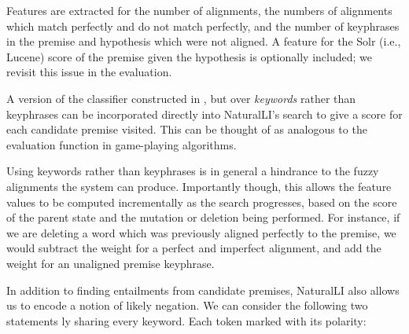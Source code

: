 Features are extracted for the number of alignments, the numbers of alignments
  which match perfectly and do not match perfectly, 
  and the number of keyphrases in the premise and hypothesis
  which were not aligned.
A feature for the Solr (i.e., Lucene) score of the premise given the hypothesis is optionally
  included; we revisit this issue in the evaluation.

%
%
A version of the classifier constructed in 
  , but over \textit{keywords} rather
  than keyphrases can be incorporated directly into
  NaturalLI's search to give a score for each candidate premise visited.
This can be thought of as analogous to the evaluation function in game-playing
  algorithms.


Using keywords rather than keyphrases is in general a hindrance to the
  fuzzy alignments the system can produce.
Importantly though, this allows the feature values to be computed 
  incrementally as the search
  progresses, based on the score of the parent state and the mutation or
  deletion being performed.
For instance, if we are deleting a word which was previously aligned perfectly
  to the premise, we would subtract the weight for a perfect and imperfect
  alignment, and add the weight for an unaligned premise keyphrase.

In addition to finding entailments from candidate premises, NaturalLI also
  allows us to encode a notion of likely negation.
We can consider the following two statements \naive ly sharing every keyword.
Each token marked with its polarity:

